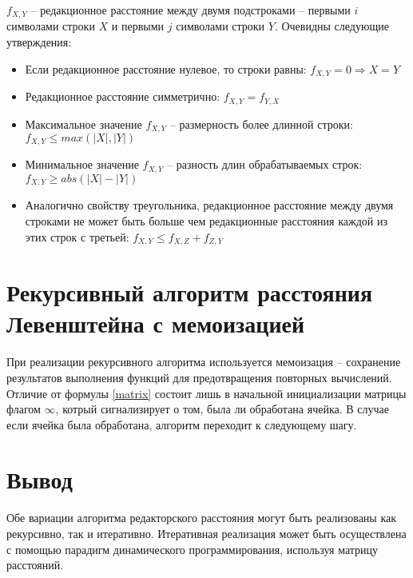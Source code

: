 $f_{X,Y}$ -- редакционное расстояние между двумя подстроками -- первыми $i$ символами строки $X$ и первыми $j$ символами строки $Y$. Очевидны следующие утверждения:
\begin{itemize}
	\item Если редакционное расстояние нулевое, то строки равны:\newline
	$f_{X, Y} = 0 \Rightarrow X = Y$ 
	\item Редакционное расстояние симметрично:\newline
	$f_{X, Y} = f_{Y, X}$ 
	\item Максимальное значение $f_{X, Y}$ -- размерность более длинной строки:\newline
	$f_{X, Y} \leq max(|X|, |Y|)$ 
	\item Минимальное значение $f_{X, Y}$ -- разность длин обрабатываемых строк:\newline
	$f_{X, Y} \geq abs(|X| - |Y|)$ 
	\item Аналогично свойству треугольника, редакционное расстояние между двумя строками не может быть больше чем редакционные расстояния каждой из этих строк с третьей:\newline
	$f_{X, Y} \leq f_{X, Z} + f_{Z, Y}$ 
\end{itemize} 



\section{Рекурсивный алгоритм расстояния Левенштейна с мемоизацией}
При реализации рекурсивного алгоритма используется мемоизация -- сохранение результатов выполнения функций для предотвращения повторных вычислений. Отличие от формулы \ref{matrix} состоит лишь в начальной инициализации матрицы флагом $\infty$, котрый сигнализирует о том, была ли обработана ячейка. В случае если ячейка была обработана, алгоритм переходит к следующему шагу. 


\section{Вывод}
Обе вариации алгоритма редакторского расстояния могут быть реализованы как рекурсивно, так и итеративно. Итеративная реализация может быть осуществлена с помощью парадигм динамического программирования, используя матрицу расстояний. \cite{damerau}